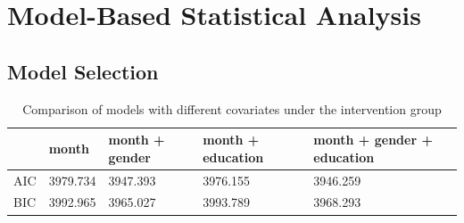\section{Model-Based Statistical Analysis}

\subsection{Model Selection}

\begin{table}[H]
\centering
\begin{tabular}{|l|l|l|l|l|}
\hline
& month & month + gender & month + education & month + gender + education \\
\hline
AIC & 3979.734 & 3947.393 & 3976.155 & 3946.259 \\
\hline
BIC & 3992.965 & 3965.027 & 3993.789 & 3968.293\\
\hline
\end{tabular}
\caption{Comparison of models with different covariates under the intervention group}
\label{tab:model.comp.intervention}
\end{table}

